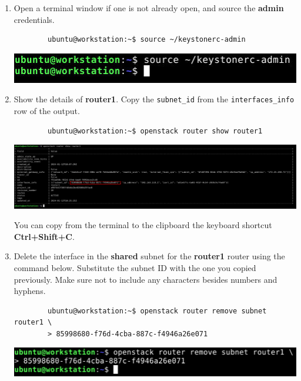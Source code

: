 \documentclass[letterpaper, 12pt]{article}
\begin{document}
\begin{enumerate}
    \item Open a terminal window if one is not already open, and source the \textbf{admin} credentials.
    \begin{lstlisting}
        ubuntu@workstation:~$ source ~/keystonerc-admin
    \end{lstlisting}

    \begin{center}
        \includegraphics[width=\linewidth]{images/part2/step8.png}
    \end{center}

    \item Show the details of \textbf{router1}. Copy the \texttt{subnet\_id} from the
    \texttt{interfaces\_info} row of the output.
    \begin{lstlisting}
        ubuntu@workstation:~$ openstack router show router1
    \end{lstlisting}

    \begin{center}
        \includegraphics[width=\linewidth]{images/part2/step9.png}
    \end{center}

    \begin{tipbox}
        You can copy from the terminal to the clipboard the keyboard shortcut \textbf{Ctrl+Shift+C}.
    \end{tipbox}

    \item Delete the interface in the \textbf{shared} subnet for the \textbf{router1} router using the command below.
    Substitute the subnet ID with the one you copied previously. Make sure not to include any characters besides numbers
    and hyphens.
    \begin{lstlisting}
        ubuntu@workstation:~$ openstack router remove subnet router1 \
        > 85998680-f76d-4cba-887c-f4946a26e071
    \end{lstlisting}

    \begin{center}
        \includegraphics[width=\linewidth]{images/part2/step10.png}
    \end{center}


\end{enumerate}
\end{document}
